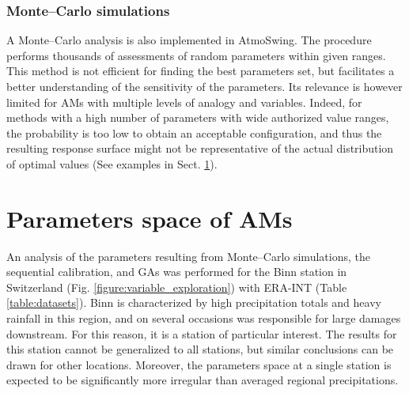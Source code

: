 \documentclass[review]{elsarticle}
\begin{document}
\subsubsection{Monte--Carlo simulations}
\label{sec:monte-carlo}

A Monte--Carlo analysis is also implemented in AtmoSwing. The procedure performs thousands of assessments of random parameters within given ranges. This method is not efficient for finding the best parameters set, but facilitates a better understanding of the sensitivity of the parameters. Its relevance is however limited for AMs with multiple levels of analogy and variables. Indeed, for methods with a high number of parameters with wide authorized value ranges, the probability is too low to obtain an acceptable configuration, and thus the resulting response surface might not be representative of the actual distribution of optimal values (See examples in Sect. \ref{sec:parameters-space}). 


\section{Parameters space of AMs}
\label{sec:parameters-space}

An analysis of the parameters resulting from Monte--Carlo simulations, the sequential calibration, and GAs was performed for the Binn station in Switzerland (Fig. \ref{figure:variable_exploration}) with ERA-INT (Table \ref{table:datasets}). Binn is characterized by high precipitation totals and heavy rainfall in this region, and on several occasions was responsible for large damages downstream. For this reason, it is a station of particular interest. The results for this station cannot be generalized to all stations, but similar conclusions can be drawn for other locations. Moreover, the parameters space at a single station is expected to be significantly more irregular than averaged regional precipitations.
\end{document}
